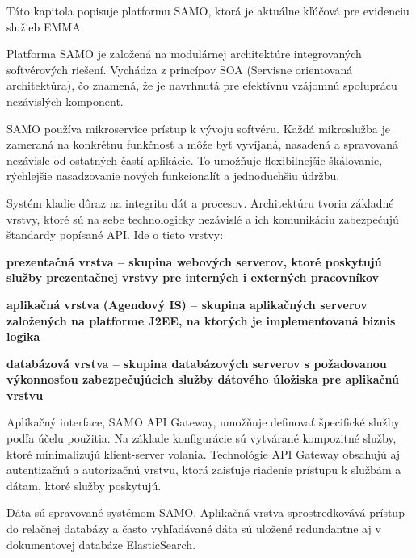 Táto kapitola popisuje platformu SAMO, ktorá je aktuálne kľúčová pre evidenciu služieb EMMA.

Platforma SAMO je založená na modulárnej architektúre integrovaných softvérových riešení. Vychádza z princípov SOA (Servisne orientovaná architektúra), čo znamená, že je navrhnutá pre efektívnu vzájomnú spoluprácu nezávislých komponent. %

SAMO používa mikroservice prístup k vývoju softvéru. Každá mikroslužba je zameraná na konkrétnu funkčnosť a môže byť vyvíjaná, nasadená a spravovaná nezávisle od ostatných častí aplikácie. To umožňuje flexibilnejšie škálovanie, rýchlejšie nasadzovanie nových funkcionalít a jednoduchšiu údržbu. %

Systém kladie dôraz na integritu dát a procesov. Architektúru tvoria základné vrstvy, ktoré sú na sebe technologicky nezávislé a ich komunikáciu zabezpečujú štandardy popísané API. Ide o tieto vrstvy:

\startitemize[n]
\item \start\bf prezentačná vrstva \stop -- skupina webových serverov, ktoré poskytujú služby prezentačnej vrstvy pre interných i externých pracovníkov
\item \start\bf aplikačná vrstva \stop (Agendový IS) -- skupina aplikačných serverov založených na platforme J2EE, na ktorých je implementovaná biznis logika
\item  \start\bf databázová vrstva \stop -- skupina databázových serverov s požadovanou výkonnosťou zabezpečujúcich služby dátového úložiska pre aplikačnú vrstvu
\stopitemize

Aplikačný interface, SAMO API Gateway, umožňuje definovať špecifické služby podľa účelu použitia. Na základe konfigurácie sú vytvárané kompozitné služby, ktoré minimalizujú klient-server volania. Technológie API Gateway obsahujú aj autentizačnú a autorizačnú vrstvu, ktorá zaisťuje riadenie prístupu k službám a dátam, ktoré služby poskytujú.

Dáta sú spravované systémom SAMO. Aplikačná vrstva sprostredkovává prístup do relačnej databázy a často vyhľadávané dáta sú uložené redundantne aj v dokumentovej databáze ElasticSearch. 

